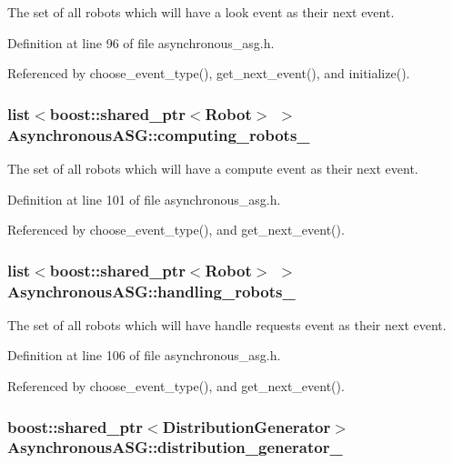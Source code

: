 The set of all robots which will have a look event as their next event. 

Definition at line 96 of file asynchronous\_\-asg.h.

Referenced by choose\_\-event\_\-type(), get\_\-next\_\-event(), and initialize().\hypertarget{class_asynchronous_a_s_g_6e47fd6b84daae67217cb3ca0b09e390}{
\subsubsection[computing\_\-robots\_\-]{\setlength{\rightskip}{0pt plus 5cm}list$<$boost::shared\_\-ptr$<$Robot$>$ $>$ {\bf AsynchronousASG::computing\_\-robots\_\-}}}
\label{class_asynchronous_a_s_g_6e47fd6b84daae67217cb3ca0b09e390}


The set of all robots which will have a compute event as their next event. 

Definition at line 101 of file asynchronous\_\-asg.h.

Referenced by choose\_\-event\_\-type(), and get\_\-next\_\-event().\hypertarget{class_asynchronous_a_s_g_f65d4f1de454809c7e7fcd44699d49e8}{
\subsubsection[handling\_\-robots\_\-]{\setlength{\rightskip}{0pt plus 5cm}list$<$boost::shared\_\-ptr$<$Robot$>$ $>$ {\bf AsynchronousASG::handling\_\-robots\_\-}}}
\label{class_asynchronous_a_s_g_f65d4f1de454809c7e7fcd44699d49e8}


The set of all robots which will have handle requests event as their next event. 

Definition at line 106 of file asynchronous\_\-asg.h.

Referenced by choose\_\-event\_\-type(), and get\_\-next\_\-event().\hypertarget{class_asynchronous_a_s_g_e5ccdc6beb099e9f243868b31bf66452}{
\subsubsection[distribution\_\-generator\_\-]{\setlength{\rightskip}{0pt plus 5cm}boost::shared\_\-ptr$<${\bf DistributionGenerator}$>$ {\bf AsynchronousASG::distribution\_\-generator\_\-}}}
\label{class_asynchronous_a_s_g_e5ccdc6beb099e9f243868b31bf66452}



